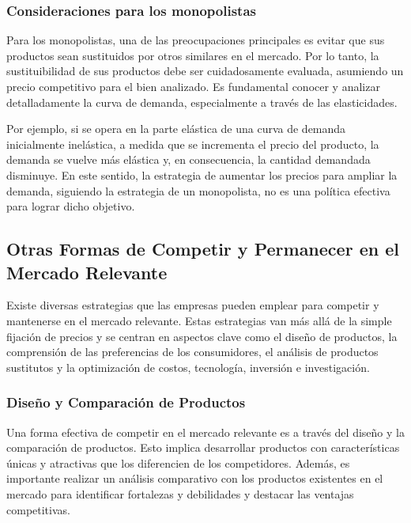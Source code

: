 \documentclass[
  letterpaper,
  DIV=11,
  numbers=noendperiod]{scrartcl}
\begin{document}
\hypertarget{consideraciones-para-los-monopolistas}{%
\subsubsection{Consideraciones para los
monopolistas}\label{consideraciones-para-los-monopolistas}}

Para los monopolistas, una de las preocupaciones principales es evitar
que sus productos sean sustituidos por otros similares en el mercado.
Por lo tanto, la sustituibilidad de sus productos debe ser
cuidadosamente evaluada, asumiendo un precio competitivo para el bien
analizado. Es fundamental conocer y analizar detalladamente la curva de
demanda, especialmente a través de las elasticidades.

Por ejemplo, si se opera en la parte elástica de una curva de demanda
inicialmente inelástica, a medida que se incrementa el precio del
producto, la demanda se vuelve más elástica y, en consecuencia, la
cantidad demandada disminuye. En este sentido, la estrategia de aumentar
los precios para ampliar la demanda, siguiendo la estrategia de un
monopolista, no es una política efectiva para lograr dicho objetivo.

\hypertarget{otras-formas-de-competir-y-permanecer-en-el-mercado-relevante}{%
\subsection{Otras Formas de Competir y Permanecer en el Mercado
Relevante}\label{otras-formas-de-competir-y-permanecer-en-el-mercado-relevante}}

Existe diversas estrategias que las empresas pueden emplear para
competir y mantenerse en el mercado relevante. Estas estrategias van más
allá de la simple fijación de precios y se centran en aspectos clave
como el diseño de productos, la comprensión de las preferencias de los
consumidores, el análisis de productos sustitutos y la optimización de
costos, tecnología, inversión e investigación.

\hypertarget{diseuxf1o-y-comparaciuxf3n-de-productos}{%
\subsubsection{Diseño y Comparación de
Productos}\label{diseuxf1o-y-comparaciuxf3n-de-productos}}

Una forma efectiva de competir en el mercado relevante es a través del
diseño y la comparación de productos. Esto implica desarrollar productos
con características únicas y atractivas que los diferencien de los
competidores. Además, es importante realizar un análisis comparativo con
los productos existentes en el mercado para identificar fortalezas y
debilidades y destacar las ventajas competitivas.
\end{document}
